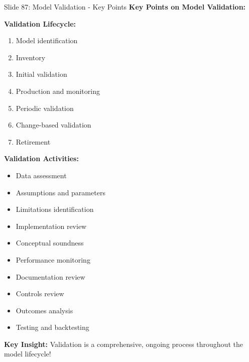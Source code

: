 \documentclass[8pt]{beamer}
\begin{document}
	\begin{frame}{Slide 87: Model Validation - Key Points}
		\fontsize{6.5}{7.5}\selectfont
		\textbf{Key Points on Model Validation:}
		
		\vspace{0.1cm}
		\textbf{Validation Lifecycle:}
		\begin{enumerate}
			\item Model identification
			\item Inventory
			\item Initial validation
			\item Production and monitoring
			\item Periodic validation
			\item Change-based validation
			\item Retirement
		\end{enumerate}
		
		\vspace{0.1cm}
		\textbf{Validation Activities:}
		\begin{itemize}
			\item Data assessment
			\item Assumptions and parameters
			\item Limitations identification
			\item Implementation review
			\item Conceptual soundness
			\item Performance monitoring
			\item Documentation review
			\item Controls review
			\item Outcomes analysis
			\item Testing and backtesting
		\end{itemize}
		
		\textcolor{myblue}{\textbf{Key Insight:}} Validation is a \textcolor{myblue}{comprehensive, ongoing process throughout the model lifecycle}!
	\end{frame}
	
\end{document}
